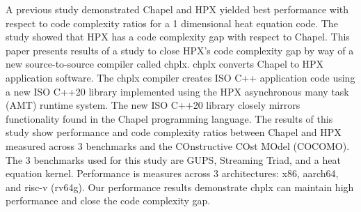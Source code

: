 A previous study demonstrated Chapel and HPX yielded best performance with respect to code complexity ratios for a 1 dimensional heat equation code. The study showed that HPX has a code complexity gap with respect to Chapel. This paper presents results of a study to close HPX's code complexity gap by way of a new source-to-source compiler called chplx. chplx converts Chapel to HPX application software. The chplx compiler creates ISO C++ application code using a new ISO C++20 library implemented using the HPX asynchronous many task (AMT) runtime system. The new ISO C++20 library closely mirrors functionality found in the Chapel programming language. The results of this study show performance and code complexity ratios between Chapel and HPX measured across 3 benchmarks and the COnstructive COst MOdel (COCOMO). The 3 benchmarks used for this study are GUPS, Streaming Triad, and a heat equation kernel. Performance is measures across 3 architectures: x86, aarch64, and risc-v (rv64g). Our performance results demonstrate chplx can maintain high performance and close the code complexity gap.

